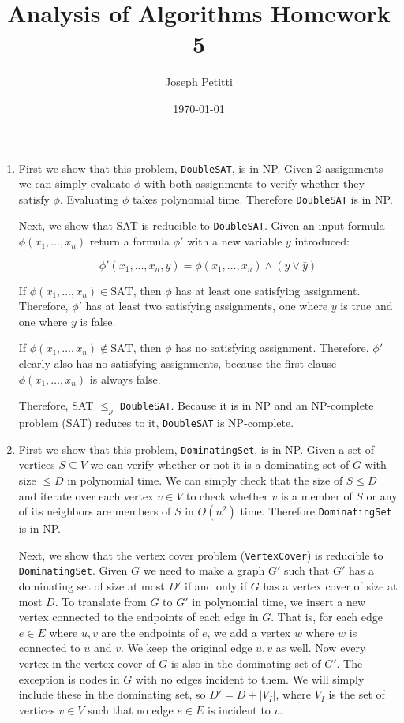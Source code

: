 \documentclass[a4paper, 10pt]{article}
\title{Analysis of Algorithms Homework 5}
\author{Joseph Petitti}
\date{\today}
\begin{document}
\maketitle

\begin{enumerate}
	\item First we show that this problem, \texttt{DoubleSAT}, is in
		\textsf{NP}. Given 2 assignments we can simply evaluate $\phi$ with both
		assignments to  verify whether they satisfy $\phi$. Evaluating $\phi$
		takes polynomial time. Therefore \texttt{DoubleSAT} is in \textsf{NP}.

		Next, we show that SAT is reducible to \texttt{DoubleSAT}. Given an
		input formula $\phi(x_1, \dots, x_n)$ return a formula $\phi'$ with a
		new variable $y$ introduced:

		$$\phi'(x_1, \dots, x_n, y) = \phi(x_1, \dots, x_n) \land (y \lor \bar
		y)$$

		If $\phi(x_1, \dots, x_n) \in \mathrm{SAT}$, then $\phi$ has at least
		one satisfying assignment. Therefore, $\phi'$ has at least two
		satisfying assignments, one where $y$ is true and one where $y$ is
		false.

		If $\phi(x_1, \dots, x_n) \notin \mathrm{SAT}$, then $\phi$ has no
		satisfying assignment. Therefore, $\phi'$ clearly also has no
		satisfying assignments, because the first clause $\phi(x_1, \dots, x_n)$
		is always false.

		Therefore, SAT $\le_p$ \texttt{DoubleSAT}. Because it is in \textsf{NP}
		and an NP-complete problem (SAT) reduces to it, \texttt{DoubleSAT} is
		NP-complete.

		\newpage

	\item First we show that this problem, \texttt{DominatingSet}, is in
		\textsf{NP}. Given a set of vertices $S \subseteq V$ we can verify
		whether or not it is a dominating set of $G$ with size $\le D$ in
		polynomial time. We can simply check that the size of $S \le D$ and
		iterate over each vertex $v \in V$ to check whether $v$ is a member of
		$S$ or any of its neighbors are members of $S$ in $O(n^2)$ time.
		Therefore \texttt{DominatingSet} is in \textsf{NP}.

		Next, we show that the vertex cover problem (\texttt{VertexCover}) is
		reducible to \texttt{DominatingSet}.  Given $G$ we need to make a graph
		$G'$ such that $G'$ has a dominating set of size at most $D'$ if and
		only if $G$ has a vertex cover of size at most $D$. To translate from
		$G$ to $G'$ in polynomial time, we insert a new vertex connected to the
		endpoints of each edge in $G$. That is, for each edge $e \in E$ where
		$u, v$ are the endpoints of $e$, we add a vertex $w$ where $w$ is
		connected to $u$ and $v$. We keep the original edge $u, v$ as well.  Now
		every vertex in the vertex cover of $G$ is also in the dominating set of
		$G'$. The exception is nodes in $G$ with no edges incident to them. We
		will simply include these in the dominating set, so $D' = D + |V_I|$,
		where $V_I$ is the set of vertices $v \in V$ such that no edge $e \in E$
		is incident to $v$.


\end{enumerate}
\end{document}
